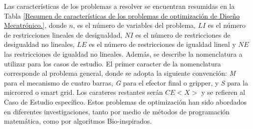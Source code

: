  Las características de los problemas a resolver se encuentran resumidas en la Tabla \ref{Resumen de características de los problemas de optimización de Diseño Mecatrónico.}, donde  $n$, es el número de variables del problema, $LI$ es el número de restricciones lineales de desigualdad, $NI$ es el número de restricciones de desigualdad no lineales,  $LE$ es el número de restricciones de igualdad lineal y $NE$ las restricciones de igualdad no lineales. Además, se describe la nomenclatura a utilizar para los casos de estudio. El primer caracter de la nomenclatura corresponde al problema general, donde se adopta la siguiente convención: \textit{M} para el mecanismo de cuatro barras, \textit{G} para el efector final o gripper, y \textit{S} para la microrred o smart grid. Los carateres restantes serán $CE<X>$ y se refieren al Caso de Estudio específico. Estos problemas de optimización han sido abordados en diferentes investigaciones, tanto por medio de métodos de programación matemática, como por algoritmos Bio-inspirados.

\begin{table}[h]
	\centering
	\caption{Resumen de características de los problemas de optimización de Diseño Mecatrónico.}
	\label{Resumen de características de los problemas de optimización de Diseño Mecatrónico.}
\end{table}



